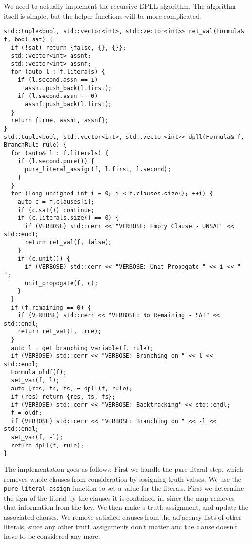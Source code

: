 \documentclass[10pt,AMS Euler]{article}
\begin{document}
We need to actually implement the recursive DPLL algorithm.
The algorithm itself is simple, but the helper functions will be more
complicated.
\begin{verbatim}
std::tuple<bool, std::vector<int>, std::vector<int>> ret_val(Formula& f, bool sat) {
  if (!sat) return {false, {}, {}};
  std::vector<int> assnt;
  std::vector<int> assnf;
  for (auto l : f.literals) {
    if (l.second.assn == 1)
      assnt.push_back(l.first);
    if (l.second.assn == 0)
      assnf.push_back(l.first);
  }
  return {true, assnt, assnf};
}
std::tuple<bool, std::vector<int>, std::vector<int>> dpll(Formula& f, BranchRule rule) {
  for (auto& l : f.literals) {
    if (l.second.pure()) {
      pure_literal_assign(f, l.first, l.second);
    }
  }
  for (long unsigned int i = 0; i < f.clauses.size(); ++i) {
    auto c = f.clauses[i];
    if (c.sat()) continue;
    if (c.literals.size() == 0) {
      if (VERBOSE) std::cerr << "VERBOSE: Empty Clause - UNSAT" << std::endl;
      return ret_val(f, false);
    }
    if (c.unit()) {
      if (VERBOSE) std::cerr << "VERBOSE: Unit Propogate " << i << " ";
      unit_propogate(f, c);
    }
  }
  if (f.remaining == 0) {
    if (VERBOSE) std::cerr << "VERBOSE: No Remaining - SAT" << std::endl;
    return ret_val(f, true);
  }
  auto l = get_branching_variable(f, rule);
  if (VERBOSE) std::cerr << "VERBOSE: Branching on " << l << std::endl;
  Formula oldf(f);
  set_var(f, l);
  auto [res, ts, fs] = dpll(f, rule);
  if (res) return {res, ts, fs};
  if (VERBOSE) std::cerr << "VERBOSE: Backtracking" << std::endl;
  f = oldf;
  if (VERBOSE) std::cerr << "VERBOSE: Branching on " << -l << std::endl;
  set_var(f, -l);
  return dpll(f, rule);
}
\end{verbatim}
The implementation goes as follows:
First we handle the pure literal step, which removes whole clauses from
consideration by assigning truth values. We use the \texttt{pure\_literal\_assign}
function to set a value for the literals. First we determine the sign
of the literal by the clauses it is contained in, since the map removes
that information from the key. We then make a truth assignment, and 
update the associated clauses. We remove satisfied clauses from the
adjacency lists of other literals, since any other truth assignments
don't matter and the clause doesn't have to be considered any more.
\end{document}
